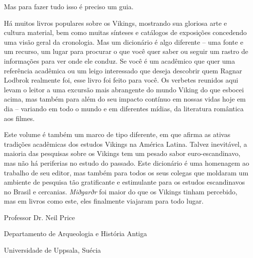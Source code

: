Mas para fazer tudo isso é preciso um guia.

Há muitos livros populares sobre os Vikings, mostrando sua gloriosa arte
e cultura material, bem como muitas sínteses e catálogos de exposições
concedendo uma visão geral da cronologia. Mas um dicionário é algo
diferente -- uma fonte e um recurso, um lugar para procurar o que você
quer saber ou seguir um rastro de informações para ver onde ele conduz.
Se você é um acadêmico que quer uma referência acadêmica ou um leigo
interessado que deseja descobrir quem Ragnar Lodbrok realmente foi, esse
livro foi feito para você. Os verbetes reunidos aqui levam o leitor a
uma excursão mais abrangente do mundo Viking do que esbocei acima, mas
também para além do seu impacto contínuo em nossas vidas hoje em dia --
variando em todo o mundo e em diferentes mídias, da literatura romântica
aos filmes.

Este volume é também um marco de tipo diferente, em que afirma as ativas
tradições acadêmicas dos estudos Vikings na América Latina. Talvez
inevitável, a maioria das pesquisas sobre os Vikings tem um pesado sabor
euro-escandinavo, mas não há periferias no estudo do passado. Este
dicionário é uma
homenagem ao
trabalho de seu editor, mas também para todos os seus colegas que
moldaram um ambiente de pesquisa tão gratificante e estimulante para os
estudos escandinavos no Brasil e cercanias. \emph{Miðgarðr} foi maior do
que os Vikings tinham percebido, mas em livros como este, eles
finalmente viajaram para todo lugar.\medskip


\hfill Professor Dr. Neil Price

\hfill Departamento de Arqueologia e História Antiga

\hfill Universidade de Uppsala, Suécia